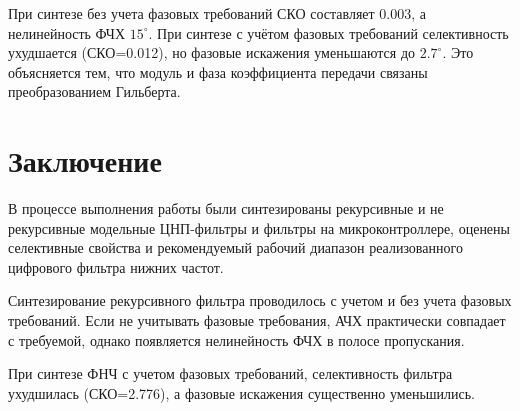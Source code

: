При синтезе без учета фазовых требований СКО составляет 0.003, а нелинейность ФЧХ $15^\circ$. При синтезе с учётом фазовых требований селективность ухудшается (СКО=0.012), но фазовые искажения уменьшаются до $2.7^\circ$. Это объясняется тем, что модуль и фаза коэффициента передачи связаны преобразованием Гильберта.




\section*{Заключение}

В процессе выполнения работы были синтезированы рекурсивные и не рекурсивные модельные  ЦНП-фильтры и фильтры на микроконтроллере, оценены селективные свойства и рекомендуемый рабочий диапазон реализованного цифрового фильтра нижних частот.

Синтезирование рекурсивного фильтра проводилось с учетом и без учета фазовых требований. Если не учитывать фазовые требования, АЧХ практически совпадает с требуемой, однако появляется нелинейность ФЧХ в полосе пропускания. 

При синтезе ФНЧ с учетом фазовых требований, селективность фильтра ухудшилась (СКО=2.776), а фазовые искажения существенно уменьшились.





